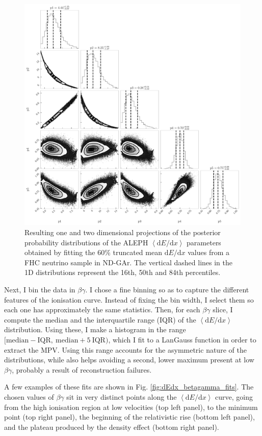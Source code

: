 \begin{figure}[t]
	\centering
	\includegraphics[width=.85\linewidth]{Images/GArSoft_PID/dEdx/mcmc_weighted_equal_frequency_bin_200.pdf}
	\caption{Resulting one and two dimensional projections of the posterior probability distributions of the ALEPH $\left<\mathrm{d}E/\mathrm{d}x\right>$ parameters obtained by fitting the $60\%$ truncated mean $\mathrm{d}E/\mathrm{d}x$ values from a FHC neutrino sample in ND-GAr. The vertical dashed lines in the 1D distributions represent the 16th, 50th and 84th percentiles.}
	\label{fig:dEdx_ALEPH_fit}
\end{figure}

Next, I bin the data in $\beta\gamma$. I chose a fine binning so as to capture the different features of the ionisation curve. Instead of fixing the bin width, I select them so each one has approximately the same statistics. Then, for each $\beta\gamma$ slice, I compute the median and the interquartile range (IQR) of the $\left<\mathrm{d}E/\mathrm{d}x\right>$ distribution. Using these, I make a histogram in the range $[\mathrm{median}-\mathrm{IQR},~ \mathrm{median}+5~\mathrm{IQR})$, which I fit to a LanGauss function in order to extract the MPV. Using this range accounts for the asymmetric nature of the distributions, while also helps avoiding a second, lower maximum present at low $\beta\gamma$, probably a result of reconstruction failures.

A few examples of these fits are shown in Fig. \ref{fig:dEdx_betagamma_fits}. The chosen values of $\beta\gamma$ sit in very distinct points along the $\left<\mathrm{d}E/\mathrm{d}x\right>$ curve, going from the high ionisation region at low velocities (top left panel), to the minimum point (top right panel), the beginning of the relativistic rise (bottom left panel), and the plateau produced by the density effect (bottom right panel).

